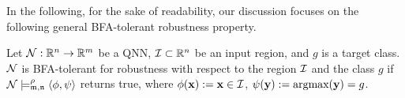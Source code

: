 

In the following, for the sake of readability, our discussion focuses on the following general BFA-tolerant robustness property.

\begin{definition}
    Let ${\mathcal{N}}:\mathbb{R}^n\rightarrow\mathbb{R}^m$ be a QNN, ${\mathcal{I}} \subset \mathbb{R}^n$ be an input region, and $g$ is a target class. ${\mathcal{N}}$ is BFA-tolerant for robustness with respect to the region ${\mathcal{I}}$ and the class $g$ if ${\mathcal{N}}\models^\rho_{\mathfrak{m},\mathfrak{n}}\langle \phi,\psi\rangle$ returns true, where $\phi({\mathbf{x}}):= {\mathbf{x}}\in{\mathcal{I}}$, $\psi({\mathbf{y}}):= \text{argmax}({\mathbf{y}})=g$.
\end{definition}

